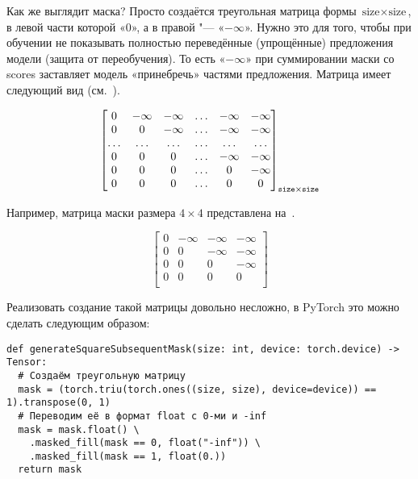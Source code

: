 Как же выглядит маска? Просто создаётся треугольная матрица формы $ \text{size} \times \text{size} $, в левой части которой «$0$», а в правой "--- «$-\infty$». Нужно это для того, чтобы при обучении не показывать полностью переведённые (упрощённые) предложения модели (защита от переобучения). То есть «$-\infty$» при суммировании маски со scores заставляет модель «принебречь» частями предложения. Матрица имеет следующий вид (см.~).

\begin{equation}\label{mask-matrix}%
  \begin{bmatrix}
    0 & -\infty & -\infty & \ldots & -\infty & -\infty \\
    0 & 0 & -\infty & \ldots & -\infty & -\infty \\ 
    \ldots & \ldots & \ldots & \ldots & \ldots & \ldots \\ 
    0 & 0 & 0 & \ldots & -\infty & -\infty \\ 
    0 & 0 & 0 & \ldots & 0 & -\infty \\ 
    0 & 0 & 0 & \ldots & 0 & 0 \\ 
  \end{bmatrix}_{\text{\texttt{size}} \times \text{\texttt{size}}}  
\end{equation}

Например, матрица маски размера $ 4\times4 $ представлена на~.

\begin{equation}\label{mask-matrix-example}%
  \begin{bmatrix}
    0 & -\infty & -\infty & -\infty \\
    0 & 0 & -\infty & -\infty \\ 
    0 & 0 & 0 & -\infty \\ 
    0 & 0 & 0 & 0 \\ 
  \end{bmatrix}  
\end{equation}

Реализовать создание такой матрицы довольно несложно, в PyTorch это можно сделать следующим образом:

\begin{verbatim}
def generateSquareSubsequentMask(size: int, device: torch.device) -> Tensor:
  # Создаём треугольную матрицу
  mask = (torch.triu(torch.ones((size, size), device=device)) == 1).transpose(0, 1)
  # Переводим её в формат float с 0-ми и -inf
  mask = mask.float() \
    .masked_fill(mask == 0, float("-inf")) \
    .masked_fill(mask == 1, float(0.))
  return mask
\end{verbatim}


